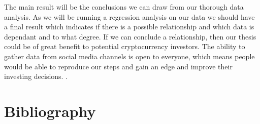 \noindent The main result will be the conclusions we can draw from our thorough data analysis. As we will be running a regression analysis on our data we should have a final result which indicates if there is a possible relationship and which data is dependant and to what degree. If we can conclude a relationship, then our thesis could be of great benefit to potential cryptocurrency investors. The ability to gather data from social media channels is open to everyone, which means people would be able to reproduce our steps and gain an edge and improve their investing decisions. 
.

\section{Bibliography}

\printbibliography
